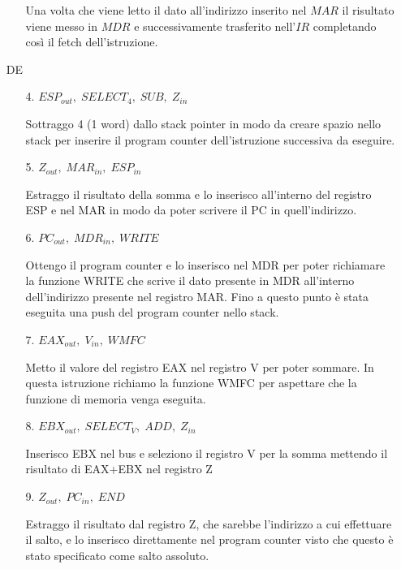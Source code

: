 \documentclass[a4paper]{article}
\theoremstyle{break}
\theoremstyle{break}
\theoremstyle{break}
\theoremstyle{break}
\begin{document}
\begin{exercise}
\begin{enumerate}
\begin{enumerate}
          \noindent Una volta che viene letto il dato all'indirizzo inserito nel \( MAR \)
          il risultato viene messo in \( MDR \) e successivamente trasferito nell'\( IR \)
          completando così il fetch dell'istruzione.
      \end{enumerate}
    \item [DE]
      \begin{enumerate}
        \item [4.] \( ESP_{out},\; SELECT_4,\; SUB,\; Z_{in} \)  

          \noindent Sottraggo 4 (1 word) dallo stack pointer in modo da creare spazio
          nello stack per inserire il program counter dell'istruzione successiva da
          eseguire.
        \item [5.] \( Z_{out},\; MAR_{in},\; ESP_{in} \) 

          \noindent Estraggo il risultato della somma e lo inserisco all'interno del
          registro ESP e nel MAR in modo da poter scrivere il PC in quell'indirizzo.
        \item [6.] \( PC_{out},\; MDR_{in},\; WRITE \) 

          \noindent Ottengo il program counter e lo inserisco nel MDR per poter richiamare
          la funzione WRITE che scrive il dato presente in MDR all'interno dell'indirizzo
          presente nel registro MAR. Fino a questo punto è stata eseguita una push del
          program counter nello stack.
        \item [7.] \( EAX_{out},\; V_{in},\; WMFC \) 

          \noindent Metto il valore del registro EAX nel registro V per poter sommare.
          In questa istruzione richiamo la funzione WMFC per aspettare che la funzione
          di memoria venga eseguita.
        \item [8.] \( EBX_{out},\; SELECT_V,\; ADD,\; Z_{in} \) 

          \noindent Inserisco EBX nel bus e seleziono il registro V per la somma mettendo
          il risultato di EAX+EBX nel registro Z
        \item [9.] \( Z_{out},\; PC_{in},\; END \) 

          \noindent Estraggo il risultato dal registro Z, che sarebbe l'indirizzo a cui
          effettuare il salto, e lo inserisco direttamente nel program counter visto che
          questo è stato specificato come salto assoluto.
      \end{enumerate}
  \end{enumerate}
\end{exercise}
\end{document}
